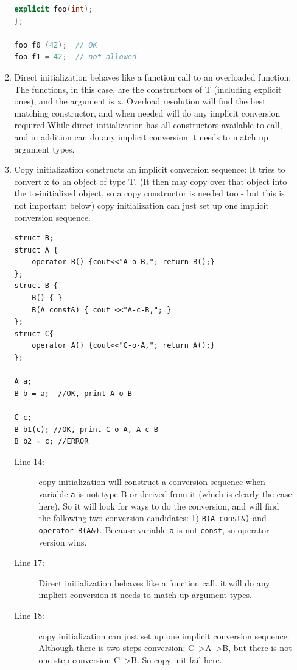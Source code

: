 \documentclass[a4paper,11pt,twoside]{book}
\begin{document}
\begin{itemize}
\begin{enumerate}
\begin{lstlisting}[frame=single, language=c++]
	explicit foo(int);
};

foo f0 (42);  // OK
foo f1 = 42;  // not allowed
\end{lstlisting}

		\item Direct initialization behaves like a function call to an overloaded function: The functions, in this case, are the constructors of T (including explicit ones), and the argument is x. Overload resolution will find the best matching constructor, and when needed will do any implicit conversion required.While direct initialization has all constructors available to call, and in addition can do any implicit conversion it needs to match up argument types.
		
		\item Copy initialization constructs an implicit conversion sequence: It tries to convert x to an object of type T. (It then may copy over that object into the to-initialized object, so a copy constructor is needed too - but this is not important below) copy initialization can just set up one implicit conversion sequence.

\begin{lstlisting}
struct B;
struct A { 
	operator B() {cout<<"A-o-B,"; return B();}
};
struct B { 
	B() { }
	B(A const&) { cout <<"A-c-B,"; }
};
struct C{
	operator A() {cout<<"C-o-A,"; return A();}
};
 
A a;
B b = a;  //OK, print A-o-B

C c;
B b1(c); //OK, print C-o-A, A-c-B
B b2 = c; //ERROR
\end{lstlisting}

\begin{description}
	\item[Line 14:]  copy initialization will construct a conversion sequence when variable \texttt{a} is not type B or derived from it (which is clearly the case here). So it will look for ways to do the conversion, and will find the following two conversion candidates: 1) \texttt{B(A const\&)} and \texttt{operator B(A\&)}. Because variable \texttt{a} is not \texttt{const}, so operator version wins. 
	
	\item[Line 17:] Direct initialization behaves like a function call. it will do any implicit conversion it needs to match up argument types.
	
	\item[Line 18:] copy initialization can just set up one implicit conversion sequence. Although there is two steps conversion: C-->A-->B, but there is not one step conversion C-->B. So copy init fail here.
\end{description}
	\end{enumerate}


\end{itemize}
\end{document}
